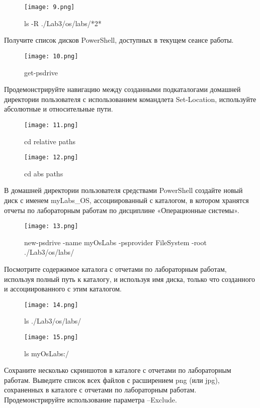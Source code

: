 \documentclass[a4paper]{article}
\begin{document}
\begin{figure}[H]
    \centering
    \texttt{[image: 9.png]}
    \caption{ls -R ./Lab3/os/labs/*2*}
\end{figure}

Получите список дисков PowerShell, доступных в текущем сеансе работы.

\begin{figure}[H]
    \centering
    \texttt{[image: 10.png]}
    \caption{get-psdrive}
\end{figure}

Продемонстрируйте навигацию между созданными подкаталогами домашней директории пользователя с использованием командлета Set-Location, используйте абсолютные и относительные пути.

\begin{figure}[H]
    \centering
    \texttt{[image: 11.png]}
    \caption{cd relative paths}
\end{figure}

\begin{figure}[H]
    \centering
    \texttt{[image: 12.png]}
    \caption{cd abs paths}
\end{figure}

В домашней директории пользователя средствами PowerShell создайте новый диск с именем myLabs\_OS, ассоциированный с каталогом, в котором хранятся отчеты по лабораторным работам по дисциплине «Операционные системы».

\begin{figure}[H]
    \centering
    \texttt{[image: 13.png]}
    \caption{new-psdrive -name myOsLabs -psprovider FileSystem -root ./Lab3/os/labs/}
\end{figure}

Посмотрите содержимое каталога с отчетами по лабораторным работам, используя полный путь к каталогу, и используя имя диска, только что созданного и ассоциированного с этим каталогом.

\begin{figure}[H]
    \centering
    \texttt{[image: 14.png]}
    \caption{ls ./Lab3/os/labs/}
\end{figure}

\begin{figure}[H]
    \centering
    \texttt{[image: 15.png]}
    \caption{ls myOsLabs:/  }
\end{figure}

Сохраните несколько скриншотов в каталоге с отчетами по лабораторным работам. Выведите список всех файлов с расширением png (или jpg), сохраненных в каталоге с отчетами по лабораторным работам. Продемонстрируйте использование параметра –Exclude.
\end{document}
